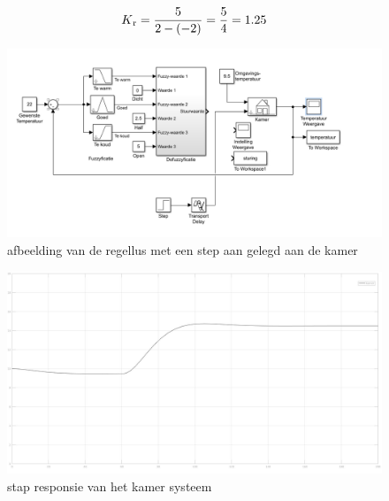 \documentclass[a4paper, 12pt]{article}
\begin{document}
\begin{equation}
	K\textsubscript{r} = \frac{5}{2-(-2)} = \frac{5}{4} = 1.25
\end{equation}

\begin{figure}[!h]
	\includegraphics[width=1\linewidth]{Labo4_1_regellus_kamer_kp.jpg}
	\caption{afbeelding van de regellus met een step aan gelegd aan de kamer}
\end{figure}

\begin{figure}[!h]
	\includegraphics[width=1\linewidth]{Labo4_1_step_response_kamer.jpg}
	\caption{stap responsie van het kamer systeem}
\end{figure}

\newpage
\end{document}
